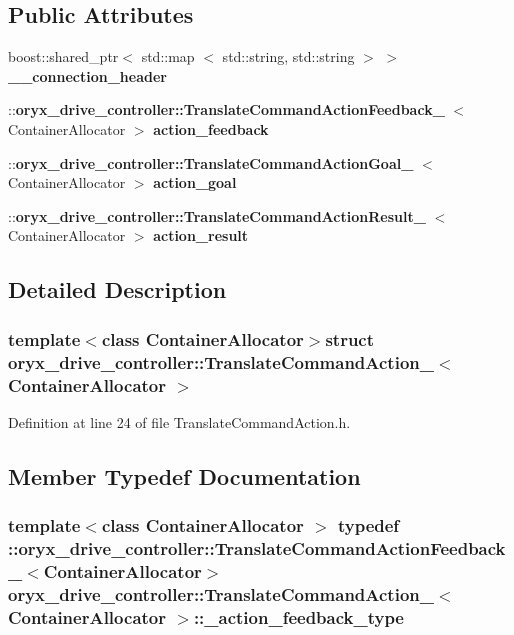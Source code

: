 \subsection*{\-Public \-Attributes}
\begin{DoxyCompactItemize}
\item 
boost\-::shared\-\_\-ptr$<$ std\-::map\*
$<$ std\-::string, std\-::string $>$ $>$ {\bf \-\_\-\-\_\-connection\-\_\-header}
\item 
\-::{\bf oryx\-\_\-drive\-\_\-controller\-::\-Translate\-Command\-Action\-Feedback\-\_\-}\*
$<$ \-Container\-Allocator $>$ {\bf action\-\_\-feedback}
\item 
\-::{\bf oryx\-\_\-drive\-\_\-controller\-::\-Translate\-Command\-Action\-Goal\-\_\-}\*
$<$ \-Container\-Allocator $>$ {\bf action\-\_\-goal}
\item 
\-::{\bf oryx\-\_\-drive\-\_\-controller\-::\-Translate\-Command\-Action\-Result\-\_\-}\*
$<$ \-Container\-Allocator $>$ {\bf action\-\_\-result}
\end{DoxyCompactItemize}


\subsection{\-Detailed \-Description}
\subsubsection*{template$<$class Container\-Allocator$>$struct oryx\-\_\-drive\-\_\-controller\-::\-Translate\-Command\-Action\-\_\-$<$ Container\-Allocator $>$}



\-Definition at line 24 of file \-Translate\-Command\-Action.\-h.



\subsection{\-Member \-Typedef \-Documentation}
\subsubsection[{\-\_\-action\-\_\-feedback\-\_\-type}]{\setlength{\rightskip}{0pt plus 5cm}template$<$class Container\-Allocator $>$ typedef \-::{\bf oryx\-\_\-drive\-\_\-controller\-::\-Translate\-Command\-Action\-Feedback\-\_\-}$<$\-Container\-Allocator$>$ {\bf oryx\-\_\-drive\-\_\-controller\-::\-Translate\-Command\-Action\-\_\-}$<$ \-Container\-Allocator $>$\-::{\bf \-\_\-action\-\_\-feedback\-\_\-type}}\label{structoryx__drive__controller_1_1TranslateCommandAction___ae772b855e86ee6a2ef9b10dcf1c58bb1}



